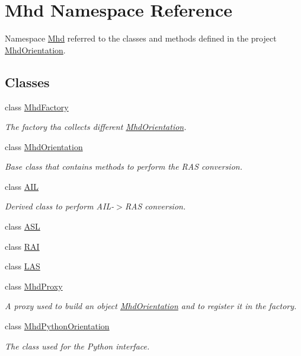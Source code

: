 \hypertarget{namespaceMhd}{\section{\-Mhd \-Namespace \-Reference}
\label{namespaceMhd}
}


\-Namespace \hyperlink{namespaceMhd}{\-Mhd} referred to the classes and methods defined in the project \hyperlink{classMhd_1_1MhdOrientation}{\-Mhd\-Orientation}.  


\subsection*{\-Classes}
\begin{DoxyCompactItemize}
\item 
class \hyperlink{classMhd_1_1MhdFactory}{\-Mhd\-Factory}
\begin{DoxyCompactList}\small\item\em \-The factory tha collects different \hyperlink{classMhd_1_1MhdOrientation}{\-Mhd\-Orientation}. \end{DoxyCompactList}\item 
class \hyperlink{classMhd_1_1MhdOrientation}{\-Mhd\-Orientation}
\begin{DoxyCompactList}\small\item\em \-Base class that contains methods to perform the \-R\-A\-S conversion. \end{DoxyCompactList}\item 
class \hyperlink{classMhd_1_1AIL}{\-A\-I\-L}
\begin{DoxyCompactList}\small\item\em \-Derived class to perform \-A\-I\-L-\/$>$\-R\-A\-S conversion. \end{DoxyCompactList}\item 
class \hyperlink{classMhd_1_1ASL}{\-A\-S\-L}
\item 
class \hyperlink{classMhd_1_1RAI}{\-R\-A\-I}
\item 
class \hyperlink{classMhd_1_1LAS}{\-L\-A\-S}
\item 
class \hyperlink{classMhd_1_1MhdProxy}{\-Mhd\-Proxy}
\begin{DoxyCompactList}\small\item\em \-A proxy used to build an object \hyperlink{classMhd_1_1MhdOrientation}{\-Mhd\-Orientation} and to register it in the factory. \end{DoxyCompactList}\item 
class \hyperlink{classMhd_1_1MhdPythonOrientation}{\-Mhd\-Python\-Orientation}
\begin{DoxyCompactList}\small\item\em \-The class used for the \-Python interface. \end{DoxyCompactList}\end{DoxyCompactItemize}
